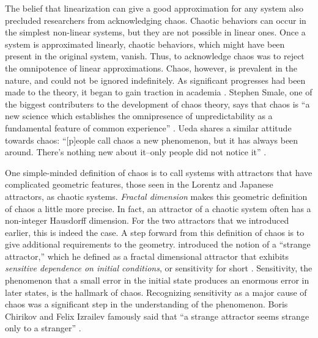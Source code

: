 \documentclass[10pt,twoside,draft]{book}
\begin{document}
The belief that linearization can give a good approximation for any system also precluded researchers from acknowledging chaos.
Chaotic behaviors can occur in the simplest non-linear systems, but they are not possible in linear ones.
Once a system is approximated linearly, chaotic behaviors, which might have been present in the original system, vanish.
Thus, to acknowledge chaos was to reject the omnipotence of linear approximations.
Chaos, however, is prevalent in the nature, and could not be ignored indefinitely.
As significant progresses had been made to the theory, it began to gain traction in academia \citep{gleick}.
Stephen Smale, one of the biggest contributers to the development of chaos theory, says that chaos is ``a new science which establishes the omnipresence of unpredictability as a fundamental feature of common experience'' \citep[p.16]{ueda-abraham}.
Ueda shares a similar attitude towards chaos: ``[p]eople call chaos a new phenomenon, but it has always been around.
There's nothing new about it--only people did not notice it''
\citep[p.27]{ueda-abraham}.

One simple-minded definition of chaos is to call systems with attractors that have complicated geometric features, those seen in the Lorentz and Japanese attractors, as chaotic systems.
\textit{Fractal dimension} makes this geometric definition of chaos a little more precise.
In fact, an attractor of a chaotic system often has a non-integer Hausdorff dimension. 
For the two attractors that we introduced earlier, this is indeed the case.
A step forward from this definition of chaos is to give additional requirements to the geometry.
\citet{ruelle} introduced the notion of a ``strange attractor,'' which he defined as a fractal dimensional attractor that exhibits \textit{sensitive dependence on initial conditions}, or sensitivity for short \citep[p.11]{ott1994}.
Sensitivity, the phenomenon that a small error in the initial state produces an enormous error in later states, is the hallmark of chaos.
Recognizing sensitivity as a major cause of chaos was a significant step in the understanding of the phenomenon.
Boris Chirikov and Felix Izrailev famously said that ``a strange attractor seems strange only to a stranger'' \citep{lorentzbook}.
\end{document}
